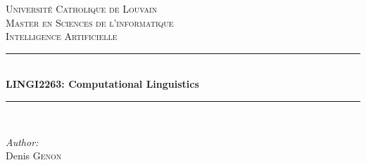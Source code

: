 \documentclass[12pt]{article} %
\begin{document}

\begin{titlepage}

\newcommand{\HRule}{\rule{\linewidth}{0.5mm}} %

\center %

\textsc{\LARGE Université Catholique de Louvain}\\[1.5cm] %
\textsc{\Large Master en Sciences de l'informatique}\\[0.5cm] %
\textsc{\large Intelligence Artificielle}\\[0.5cm] %

\HRule \\[0.4cm]
{ \huge \bfseries LINGI2263: Computational Linguistics}\\[0.4cm] %
\HRule \\[1.5cm]

\begin{minipage}{0.4\textwidth}
\begin{flushleft} \large
\emph{Author:}\\
Denis \textsc{Genon} %
\end{flushleft}
\end{minipage}
~



\vfill %

\end{titlepage}


\tableofcontents %

\newpage
\end{document}
